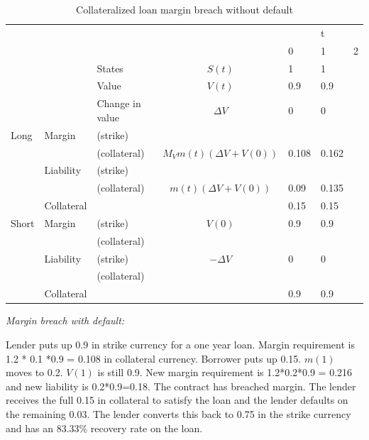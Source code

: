 \documentclass[12pt]{article}
\begin{document}
\begin{table}
\begin{tabular}{lll|c|lll}
&  &  &  &   & t &\\  
&  &  &  & 0 & 1 & 2\\
\hline
\hline
&  & States &  $S(t)$ & 1 & 1 & \\
&  & Value  &  $V(t)$  & 0.9 & 0.9 &  \\
&  & Change in value & $\Delta V$ & 0& 0 &  \\
\hline
Long      & Margin    & (strike)     &  &  &  &  \\
          &           & (collateral) & $M_V m(t)(\Delta V + V(0))$ & 0.108 & 0.162 &\\ 
          & Liability & (strike)     &  &  &  & \\ 
          &           & (collateral)& $m(t)(\Delta V + V(0))$& 0.09  & 0.135 &\\
          & Collateral&        
          &    & 0.15 & 0.15 & \\ 
\hline          
Short     & Margin    & (strike)     & $V(0)$ & 0.9 & 0.9 & \\
          &           & (collateral) & & & &\\
          & Liability & (strike)     & $-\Delta V$ & 0 & 0 & \\
          &           & (collateral) & & & &\\
          & Collateral&                       &    & 0.9 & 0.9 & \\ 
\hline          

\end{tabular}
\caption{Collateralized loan margin breach without default}
\label{fut}
\end{table}

\textit{Margin breach with default:}

Lender puts up 0.9 in strike currency for a one year loan. Margin requirement is 1.2 * 0.1 *0.9 = 0.108 in collateral currency. Borrower puts up 0.15.
$m(1)$ moves to 0.2. $V(1)$ is still 0.9. New margin requirement is 1.2*0.2*0.9 = 0.216 and new liability is 0.2*0.9=0.18.  The contract has breached margin. The lender receives the full 0.15 in collateral to satisfy the loan and the lender defaults on the remaining 0.03. The lender converts this back to 0.75 in the strike currency and has an 83.33\% recovery rate on the loan. 
\end{document}
